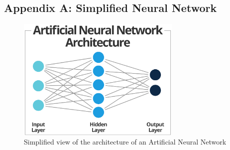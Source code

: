 \documentclass[a4paper,12pt]{report}
\begin{document}
\subsection{Appendix A: Simplified Neural Network}\label{app:a}
\begin{figure}[htpb]
    \centering
    \includegraphics[width=0.7\textwidth,keepaspectratio=true]{ANN.png}
    \caption{Simplified view of the architecture of an Artificial Neural Network ~\cite{Image:ANN}}
\end{figure}
\clearpage
\end{document}
